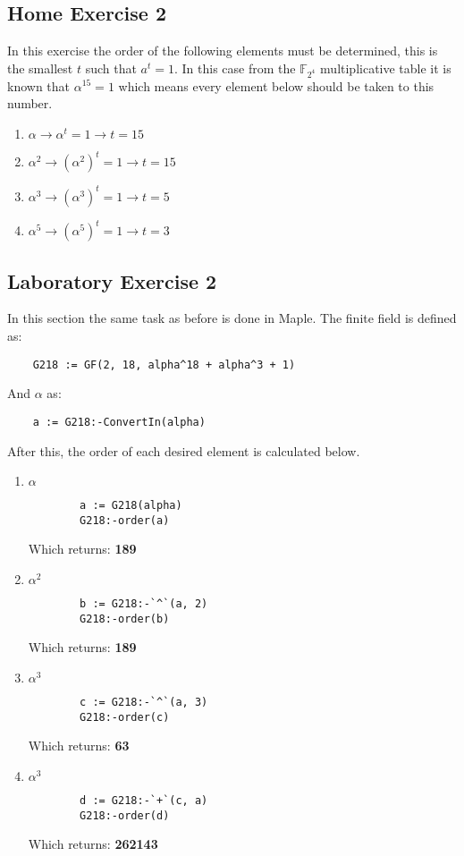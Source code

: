 \documentclass{article}
\begin{document}
\subsection{Home Exercise 2}
In this exercise the order of the following elements must be determined, this is the smallest $t$ such that $a^t = 1$. In this case from the $\mathbb F_{2^4}$ multiplicative table it is known that $\alpha^15 = 1$ which means every element below should be taken to this number.
\begin{enumerate}
    \item $\alpha \rightarrow \alpha^t = 1 \rightarrow t = 15$
    \item $\alpha^2 \rightarrow (\alpha^2)^t = 1 \rightarrow t = 15$
    \item $\alpha^3 \rightarrow (\alpha^3)^t = 1 \rightarrow t = 5$
    \item $\alpha^5 \rightarrow (\alpha^5)^t = 1 \rightarrow t = 3$
    
\end{enumerate}
\subsection{Laboratory Exercise 2}
In this section the same task as before is done in Maple. The finite field is defined as:
\begin{verbatim}
    G218 := GF(2, 18, alpha^18 + alpha^3 + 1)
\end{verbatim}
And $\alpha$ as:
\begin{verbatim}
    a := G218:-ConvertIn(alpha)
\end{verbatim}
After this, the order of each desired element is calculated below.
\begin{enumerate}
    \item $\alpha$ \\
    \begin{verbatim}
        a := G218(alpha)
        G218:-order(a)
    \end{verbatim}
    Which returns: \textbf{189}
    \item $\alpha^2$ \\
    \begin{verbatim}
        b := G218:-`^`(a, 2)
        G218:-order(b)
    \end{verbatim}
    Which returns: \textbf{189}
    \item $\alpha^3$ \\
    \begin{verbatim}
        c := G218:-`^`(a, 3)
        G218:-order(c)
    \end{verbatim}
    Which returns: \textbf{63}
    \item $\alpha^3$ \\
    \begin{verbatim}
        d := G218:-`+`(c, a)
        G218:-order(d)
    \end{verbatim}
    Which returns: \textbf{262143}
\end{enumerate}
\end{document}
